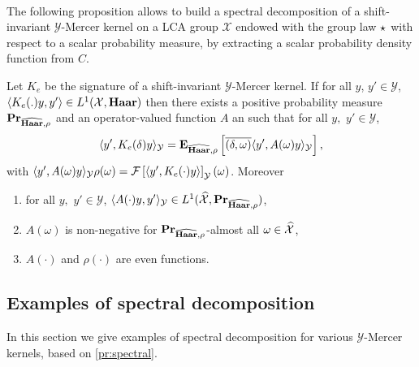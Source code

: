 \documentclass[twoside,11pt]{article}
\begin{document}
\paragraph{}
The following proposition allows to build a spectral decomposition of a
shift-invariant $\mathcal{Y}$-Mercer kernel on a \acs{LCA} group $\mathcal{X}$
endowed with the group law $\star$ with respect to a scalar probability
measure, by extracting a scalar probability density function from $C$.
\begin{proposition}
\label{pr:spectral}
    Let $K_e$ be the signature of a shift-invariant $\mathcal{Y}$-Mercer
    kernel. If for all $y$, $y' \in\mathcal{Y}$, $\langle K_e(.)y,y'\rangle\in
    L^1(\mathcal{X},\mathbf{Haar})$ then there exists a positive probability measure
    ${\mathbf{{Pr}}}_{\widehat{\mathbf{Haar}},\rho}$ and an operator-valued function $A$ an
    such that for all $y,$ $y'\in\mathcal{Y}$,
    \begin{dmath}
        \label{eq:expectation_spec} \inner{y', K_e(\delta)y}_{\mathcal{Y}}
        =\expectation_{\dual{\Haar},\rho}\left[\conj{\pairing{\delta,
        \omega}}\inner{y', A(\omega)y}_{\mathcal{Y}}\right],
    \end{dmath}
    with $\langle y', A(\omega)y\rangle_{\mathcal{Y}}\rho(\omega) = \mathcal{F}\left[\langle y',
    K_e(\cdot)y\rangle\right]_{\mathcal{Y}}(\omega)$.  Moreover
    \begin{enumerate}
        \item for all $y,$ $y'\in\mathcal{Y}$,
        $\langle A(\cdot)y,y'\rangle_{\mathcal{Y}}\in
        L^1(\widehat{\mathcal{X}}, {\mathbf{{Pr}}}_{\widehat{\mathbf{Haar}},\rho})$,
        \item $A(\omega)$ is non-negative for
        ${\mathbf{{Pr}}}_{\widehat{\mathbf{Haar}},\rho}$-almost all
        $\omega\in\widehat{\mathcal{X}}$,
        \item $A(\cdot)$ and $\rho(\cdot)$ are even functions.
    \end{enumerate}
\end{proposition}
\subsection{Examples of spectral decomposition}
\label{subsec:dec_examples}
In this section we give examples of spectral decomposition for various
$\mathcal{Y}$-Mercer kernels, based on \cref{pr:spectral}.
\end{document}
